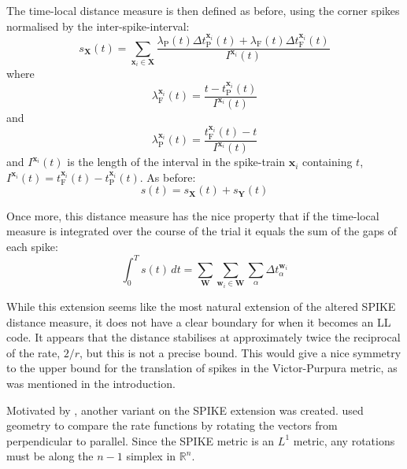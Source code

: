 The time-local distance measure is then defined as before, using the corner spikes normalised by the inter-spike-interval:
\begin{equation}
s_{\mathbf{X}}(t) = \sum_{\mathbf{x}_i \in \mathbf{X}} \frac{\lambda_{\mathrm{P}}(t)\Delta t_{\mathrm{P}}^{\mathbf{x}_i} (t) + \lambda_{\mathrm{F}}(t)\Delta t_{\mathrm{F}}^{\mathbf{x}_i}(t) }{I^{\mathbf{x}_i}(t) }%
\end{equation}
where 
\begin{equation}
\lambda_{\mathrm{F}}^{\mathbf{x}_i}(t) =\frac{ t-t_{\mathrm{P}}^{\mathbf{x}_i}(t)}{I^{\mathbf{x}_i}(t)}%
\end{equation}
and
\begin{equation}
 \lambda_{\mathrm{P}}^{\mathbf{x}_i}(t) =\frac{ t_{\mathrm{F}}^{\mathbf{x}_i}(t) - t}{I^{\mathbf{x}_i}(t)}%
\end{equation}
and $I^{\mathbf{x}_i}(t)$ is the length of the interval in the spike-train $\mathbf{x}_i$ containing $t$, $I^{\mathbf{x}_i}(t) = t_{\mathrm{F}}^{\mathbf{x}_i}(t) - t_{\mathrm{P}}^{\mathbf{x}_i}(t)$.
 As before:
\begin{equation}
s(t) = s_{\mathbf{X}}(t) + s_{\mathbf{Y}}(t)
\end{equation}

Once more, this distance measure has the nice property that if the time-local measure is integrated over the course of the trial it equals the sum of the gaps of each spike:
\begin{equation}
\int_0^T s(t)\,dt = \sum_{\mathbf{W}} \sum_{\mathbf{w}_i \in \mathbf{W}} \sum_{\alpha} \Delta t_{\alpha}^{\mathbf{w}_i}
\end{equation}

While this extension seems like the most natural extension of the altered SPIKE distance measure, it does not have a clear boundary for when it becomes an LL code.  It appears that the distance stabilises at approximately twice the reciprocal of the rate, $2/r$, but this is not a precise bound.  This would give a nice symmetry to the upper bound for the translation of spikes in the Victor-Purpura metric, as was mentioned in the introduction.

Motivated by \citep{HoughtonSen2008a}, another variant on the SPIKE extension was created.  \citet{HoughtonSen2008a} used geometry to compare the rate functions by rotating the vectors from perpendicular to parallel.  Since the SPIKE metric is an $L^1$ metric, any rotations must be along the $n-1$ simplex in $\mathbb{R}^n$.


